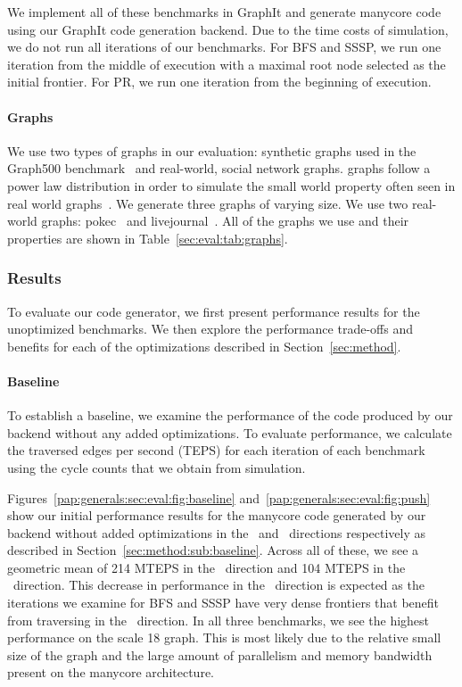We implement all of these benchmarks in GraphIt and generate manycore code using our GraphIt code generation backend.
Due to the time costs of simulation, we do not run all iterations of our benchmarks. 
For BFS and SSSP, we run one iteration from the middle of execution with a maximal root node selected as the initial frontier.
For PR, we run one iteration from the beginning of execution.



\paragraph{Graphs} We use two types of graphs in our evaluation: synthetic \kron graphs used in the Graph500 benchmark~\cite{murphy2010graph500} and real-world, social network graphs.
\kron graphs follow a power law distribution in order to simulate the small world property often seen in real world graphs~\cite{leskovec2010kronecker}.
We generate three \kron graphs of varying size. 
We use two real-world graphs: pokec~\cite{pokec} and livejournal~\cite{lj}.
All of the graphs we use and their properties are shown in Table~\ref{sec:eval:tab:graphs}.


\subsubsection{Results}
\baselineEvalFigure

To evaluate our code generator, we first present performance results for the unoptimized benchmarks. 
We then explore the performance trade-offs and benefits for each of the optimizations described in Section~\ref{sec:method}.

\paragraph{Baseline}
 
\pushEvalFigure
To establish a baseline, we examine the performance of the code produced by our backend without any added optimizations.
To evaluate performance, we calculate the traversed edges per second (TEPS) for each iteration of each benchmark using the cycle counts that we obtain from simulation.

Figures~\ref{pap:generals:sec:eval:fig:baseline} and~\ref{pap:generals:sec:eval:fig:push} show our initial performance results for the manycore code generated by our backend without added optimizations in the \pull~and \push~directions respectively as described in Section~\ref{sec:method:sub:baseline}.
Across all of these, we see a geometric mean of 214 MTEPS in the \pull~direction and 104 MTEPS in the \push~direction. 
This decrease in performance in the \push~direction is expected as the iterations we examine for BFS and SSSP have very dense frontiers that benefit from traversing in the \pull~direction.
In all three benchmarks, we see the highest performance on the \kron scale 18 graph.
This is most likely due to the relative small size of the graph and the large amount of parallelism and memory bandwidth present on the manycore architecture.
 
